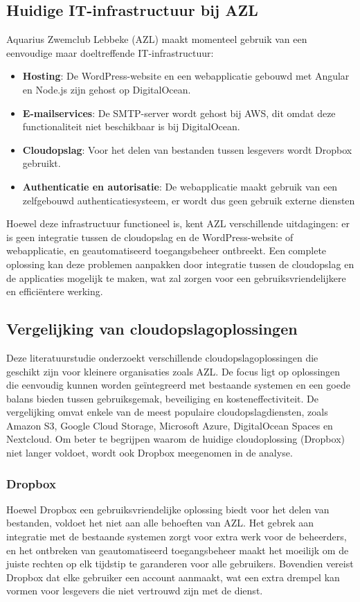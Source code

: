\subsection{Huidige IT-infrastructuur bij AZL}
Aquarius Zwemclub Lebbeke (AZL) maakt momenteel gebruik van een eenvoudige maar doeltreffende IT-infrastructuur:
\begin{itemize}
    \item \textbf{Hosting}: De WordPress-website en een webapplicatie gebouwd met Angular en Node.js zijn gehost op DigitalOcean.
    \item \textbf{E-mailservices}: De SMTP-server wordt gehost bij AWS, dit omdat deze functionaliteit niet beschikbaar is bij DigitalOcean.
    \item \textbf{Cloudopslag}: Voor het delen van bestanden tussen lesgevers wordt Dropbox gebruikt.
    \item \textbf{Authenticatie en autorisatie}: De webapplicatie maakt gebruik van een zelfgebouwd authenticatiesysteem, er wordt dus geen gebruik externe diensten
\end{itemize}
Hoewel deze infrastructuur functioneel is, kent AZL verschillende uitdagingen: er is geen integratie tussen de cloudopslag en de 
WordPress-website of webapplicatie, en geautomatiseerd toegangsbeheer ontbreekt. Een complete oplossing kan deze problemen aanpakken 
door integratie tussen de cloudopslag en de applicaties mogelijk te maken, wat zal zorgen voor een gebruiksvriendelijkere en efficiëntere werking.

\subsection{Vergelijking van cloudopslagoplossingen}
Deze literatuurstudie onderzoekt verschillende cloudopslagoplossingen die geschikt zijn voor kleinere organisaties zoals AZL. 
De focus ligt op oplossingen die eenvoudig kunnen worden geïntegreerd met bestaande systemen en een goede balans bieden tussen gebruiksgemak, 
beveiliging en kosteneffectiviteit. De vergelijking omvat enkele van de meest populaire cloudopslagdiensten, zoals Amazon S3, Google Cloud Storage, 
Microsoft Azure, DigitalOcean Spaces en Nextcloud. Om beter te begrijpen waarom de huidige cloudoplossing (Dropbox) niet langer voldoet, wordt ook 
Dropbox meegenomen in de analyse.

\subsubsection{Dropbox}
Hoewel Dropbox een gebruiksvriendelijke oplossing biedt voor het delen van bestanden, voldoet het niet aan alle behoeften van AZL. 
Het gebrek aan integratie met de bestaande systemen zorgt voor extra werk voor de beheerders, en het ontbreken van geautomatiseerd 
toegangsbeheer maakt het moeilijk om de juiste rechten op elk tijdstip te garanderen voor alle gebruikers. Bovendien vereist Dropbox dat 
elke gebruiker een account aanmaakt, wat een extra drempel kan vormen voor lesgevers die niet vertrouwd zijn met de dienst.


